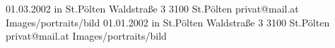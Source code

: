 
\begin{Diplomandenvorstellung}
		  {01.03.2002 in St.Pölten}
		  {Waldstraße 3}
		  {3100 St.Pölten}
		  {
		  }
		  {privat@mail.at}
		  {Images/portraits/bild}
\blankpage
			{01.01.2002 in St.Pölten}
			{Waldstraße 3}
			{3100 St.Pölten}
			{
			}
			{privat@mail.at}
			{Images/portraits/bild}
\end{Diplomandenvorstellung}

